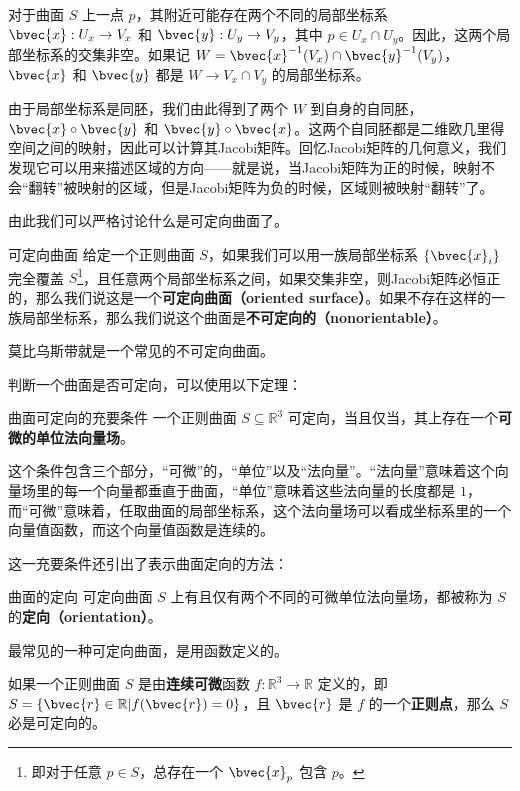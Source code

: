 

对于曲面 $S$ 上一点 $p$，其附近可能存在两个不同的局部坐标系 $\bvec{x}:U_x\to V_x$ 和 $\bvec{y}:U_y\to V_y$，其中 $p\in U_x\cap U_y$。因此，这两个局部坐标系的交集非空。如果记 $W=\bvec{x}^{-1}(V_x)\cap\bvec{y}^{-1}(V_y)$，$\bvec{x}$ 和 $\bvec{y}$ 都是 $W\to V_x\cap V_y$ 的局部坐标系。

由于局部坐标系是同胚，我们由此得到了两个 $W$ 到自身的自同胚，$\bvec{x}\circ\bvec{y}$ 和 $\bvec{y}\circ\bvec{x}$。这两个自同胚都是二维欧几里得空间之间的映射，因此可以计算其Jacobi矩阵。回忆Jacobi矩阵的几何意义，我们发现它可以用来描述区域的方向——就是说，当Jacobi矩阵为正的时候，映射不会“翻转”被映射的区域，但是Jacobi矩阵为负的时候，区域则被映射“翻转”了。

由此我们可以严格讨论什么是可定向曲面了。

\begin{definition}{可定向曲面}
给定一个正则曲面 $S$，如果我们可以用一族局部坐标系 $\{\bvec{x}_i\}$ 完全覆盖 $S$\footnote{即对于任意 $p\in S$，总存在一个 $\bvec{x}_p$ 包含 $p$。}，且任意两个局部坐标系之间，如果交集非空，则Jacobi矩阵必恒正的，那么我们说这是一个\textbf{可定向曲面（oriented surface）}。如果不存在这样的一族局部坐标系，那么我们说这个曲面是\textbf{不可定向的（nonorientable）}。
\end{definition}

莫比乌斯带就是一个常见的不可定向曲面。

判断一个曲面是否可定向，可以使用以下定理：

\begin{theorem}{曲面可定向的充要条件}
一个正则曲面 $S\subseteq \mathbb{R}^3$ 可定向，当且仅当，其上存在一个\textbf{可微的单位法向量场}。
\end{theorem}

这个条件包含三个部分，“可微”的，“单位”以及“法向量”。“法向量”意味着这个向量场里的每一个向量都垂直于曲面，“单位”意味着这些法向量的长度都是 $1$，而“可微”意味着，任取曲面的局部坐标系，这个法向量场可以看成坐标系里的一个向量值函数，而这个向量值函数是连续的。

这一充要条件还引出了表示曲面定向的方法：

\begin{definition}{曲面的定向}
可定向曲面 $S$ 上有且仅有两个不同的可微单位法向量场，都被称为 $S$ 的\textbf{定向（orientation）}。
\end{definition}

最常见的一种可定向曲面，是用函数定义的。

\begin{theorem}{}
如果一个正则曲面 $S$ 是由\textbf{连续可微}函数 $f:\mathbb{R}^3\to \mathbb{R}$ 定义的，即 $S=\{\bvec{r}\in\mathbb{R}|f(\bvec{r})=0\}$，且 $\bvec{r}$ 是 $f$ 的一个\textbf{正则点}，那么 $S$ 必是可定向的。
\end{theorem}






